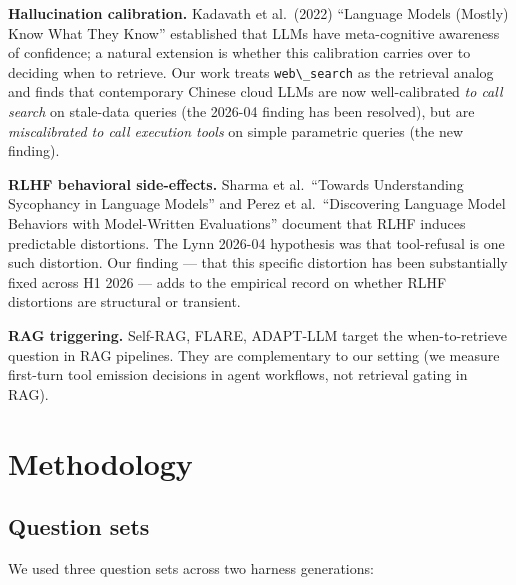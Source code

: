 \documentclass[11pt]{article}
\providecommand{\passthrough}[1]{#1}
\begin{document}
\textbf{Hallucination calibration.} Kadavath et al.~(2022) ``Language
Models (Mostly) Know What They Know'' established that LLMs have
meta-cognitive awareness of confidence; a natural extension is whether
this calibration carries over to deciding when to retrieve. Our work
treats \passthrough{\lstinline!web\_search!} as the retrieval analog and
finds that contemporary Chinese cloud LLMs are now well-calibrated
\emph{to call search} on stale-data queries (the 2026-04 finding has
been resolved), but are \emph{miscalibrated to call execution tools} on
simple parametric queries (the new finding).

\textbf{RLHF behavioral side-effects.} Sharma et al.~``Towards
Understanding Sycophancy in Language Models'' and Perez et
al.~``Discovering Language Model Behaviors with Model-Written
Evaluations'' document that RLHF induces predictable distortions. The
Lynn 2026-04 hypothesis was that tool-refusal is one such distortion.
Our finding --- that this specific distortion has been substantially
fixed across H1 2026 --- adds to the empirical record on whether RLHF
distortions are structural or transient.

\textbf{RAG triggering.} Self-RAG, FLARE, ADAPT-LLM target the
when-to-retrieve question in RAG pipelines. They are complementary to
our setting (we measure first-turn tool emission decisions in agent
workflows, not retrieval gating in RAG).



\section{Methodology}\label{sec:methodology}

\subsection{Question sets}\label{sec:question-sets}

We used three question sets across two harness generations:
\end{document}
